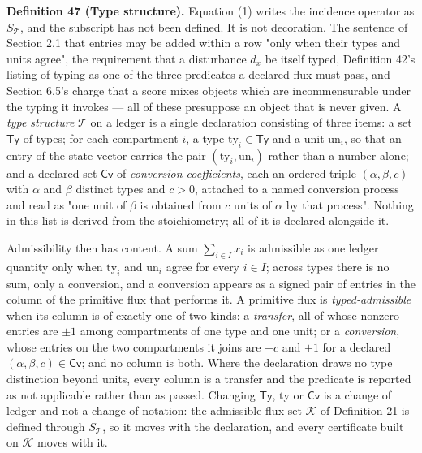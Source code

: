 \documentclass[11pt]{article}
\begin{document}
\textbf{Definition 47 (Type structure).} Equation (1) writes the incidence operator as \(S_{\mathcal{T}}\), and the
subscript has not been defined. It is not decoration. The sentence of Section 2.1 that entries may be added
within a row "only when their types and units agree", the requirement that a disturbance \(d_x\) be itself typed,
Definition 42's listing of typing as one of the three predicates a declared flux must pass, and Section 6.5's
charge that a score mixes objects which are incommensurable under the typing it invokes --- all of these
presuppose an object that is never given. A \emph{type structure} \(\mathcal{T}\) on a ledger is a single declaration consisting of three
items: a set \(\mathsf{Ty}\) of types; for each compartment \(i\), a type \(\mathrm{ty}_i \in \mathsf{Ty}\) and a
unit \(\mathrm{un}_i\), so that an entry of the state vector carries the pair
\((\mathrm{ty}_i, \mathrm{un}_i)\) rather than a number alone; and a declared set \(\mathsf{Cv}\) of \emph{conversion
coefficients}, each an ordered triple \((\alpha, \beta, c)\) with \(\alpha\) and \(\beta\) distinct types and
\(c > 0\), attached to a named conversion process and read as "one unit of \(\beta\) is obtained from \(c\) units of
\(\alpha\) by that process". Nothing in this list is derived from the stoichiometry; all of it is declared
alongside it.

Admissibility then has content. A sum \(\sum_{i \in I} x_i\) is admissible as one ledger quantity only when
\(\mathrm{ty}_i\) and \(\mathrm{un}_i\) agree for every \(i \in I\); across types there is no sum, only a conversion,
and a conversion appears as a signed pair of entries in the column of the primitive flux that performs it. A
primitive flux is \emph{typed-admissible} when its column is of exactly one of two kinds: a \emph{transfer}, all of whose
nonzero entries are \(\pm 1\) among compartments of one type and one unit; or a \emph{conversion}, whose entries on
the two compartments it joins are \(-c\) and \(+1\) for a declared \((\alpha, \beta, c) \in \mathsf{Cv}\); and no
column is both. Where the declaration draws no type distinction beyond units, every column is a transfer and
the predicate is reported as not applicable rather than as passed. Changing \(\mathsf{Ty}\), \(\mathrm{ty}\) or
\(\mathsf{Cv}\) is a change of ledger and not a change of notation: the admissible flux set \(\mathcal{K}\) of
Definition 21 is defined through \(S_{\mathcal{T}}\), so it moves with the declaration, and every certificate
built on \(\mathcal{K}\) moves with it.
\end{document}

